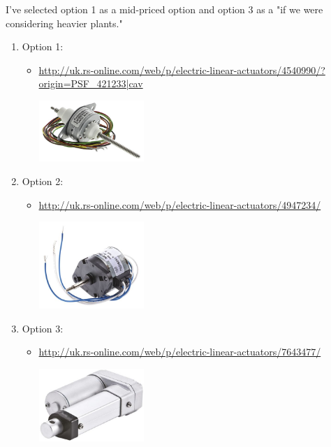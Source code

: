 \documentclass[11pt]{article}
\begin{document}
I've selected option 1 as a mid-priced option and option 3 as a "if we were considering heavier plants." 
\begin{enumerate}
\item Option 1:
\label{sec-1-1-2-1}

\begin{itemize}
\item \url{http://uk.rs-online.com/web/p/electric-linear-actuators/4540990/?origin=PSF_421233|cav}

\includegraphics[width=150px]{./images/act1.jpg}
\end{itemize}


\item Option 2:
\label{sec-1-1-2-2}

\begin{itemize}
\item \url{http://uk.rs-online.com/web/p/electric-linear-actuators/4947234/}

\includegraphics[width=150px]{./images/act2.jpg}
\end{itemize}

\item Option 3:
\label{sec-1-1-2-3}

\begin{itemize}
\item \url{http://uk.rs-online.com/web/p/electric-linear-actuators/7643477/}

\includegraphics[width=150px]{./images/act3.jpg}
\end{itemize}
\end{enumerate}
\end{document}

